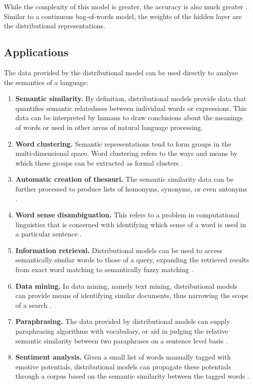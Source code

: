 \documentclass[14pt, a4paper]{extreport}
\begin{document}
While the complexity of this model is greater, the accuracy is also much greater \parencite{mikolov}. Similar to a continuous bag-of-words model, the weights of the hidden layer are the distributional representations.
    \subsection{Applications}
The data provided by the distributional model can be used directly to analyse the semantics of a language:

\begin{enumerate}
  \item \textbf{Semantic similarity.} By definition, distributional models provide data that quantifies semantic relatedness between individual words or expressions. This data can be interpreted by humans to draw conclusions about the meanings of words or used in other areas of natural language processing.
  \item \textbf{Word clustering.} Semantic representations tend to form groups in the multi-dimensional space. Word clustering refers to the ways and means by which these groups can be extracted as formal clusters \parencite{bekkerman}.
  \item \textbf{Automatic creation of thesauri.} The semantic similarity data can be further processed to produce lists of homonyms, synonyms, or even antonyms \parencite{henestroza}.
  \item \textbf{Word sense disambiguation.} This refers to a problem in computational linguistics that is concerned with identifying which sense of a word is used in a particular sentence \parencite{musto}.
  \item \textbf{Information retrieval.} Distributional models can be used to access semantically similar words to those of a query, expanding the retrieved results from exact word matching to semantically fuzzy matching \parencite{silva}.
  \item \textbf{Data mining.} In data mining, namely text mining, distributional models can provide means of identifying similar documents, thus narrowing the scope of a search \parencite[89]{dalianis}.
  \item \textbf{Paraphrasing.} The data provided by distributional models can supply paraphrasing algorithms with vocabulary, or aid in judging the relative semantic similarity between two paraphrases on a sentence level basis \parencite{desouki}.
  \item \textbf{Sentiment analysis.} Given a small list of words manually tagged with emotive potentials, distributional models can propagate these potentials through a corpus based on the semantic similarity between the tagged words \parencite{alshari}.
\end{enumerate}
\end{document}
